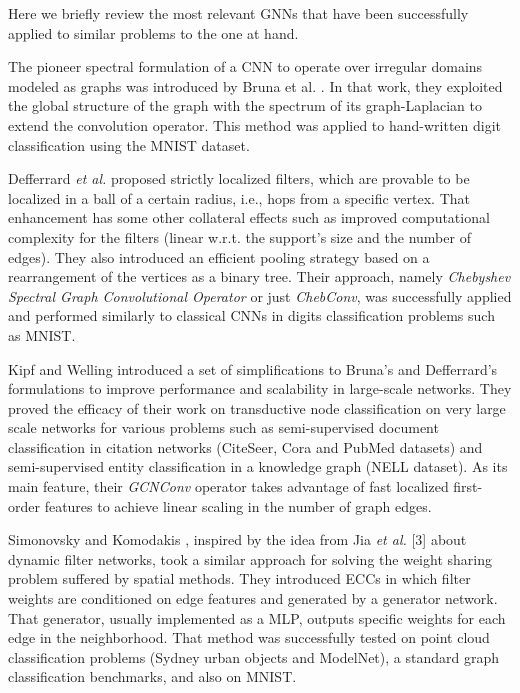 Here we briefly review the most relevant \acp{GNN} that have been successfully applied to similar problems to the one at hand.

The pioneer spectral formulation of a CNN to operate over irregular domains modeled as graphs was introduced by Bruna et al. \cite{Bruna2013}. In that work, they exploited the global structure of the graph with the spectrum of its graph-Laplacian to extend the convolution operator. This method was applied to hand-written digit classification using the \ac{MNIST} dataset.

Defferrard \emph{et al.} \cite{Defferrard2016} proposed strictly localized filters, which are provable to be localized in a ball of a certain radius, i.e., hops from a specific vertex. That enhancement has some other collateral effects such as improved computational complexity for the filters (linear w.r.t. the support’s size and the number of edges). They also introduced an efficient  pooling strategy based on a rearrangement of the vertices as a binary tree. Their approach, namely \emph{Chebyshev Spectral Graph Convolutional Operator} or just \emph{ChebConv}, was successfully applied and performed similarly to classical \acp{CNN} in digits classification problems such as \acs{MNIST}.

Kipf and Welling \cite{Kipf2016} introduced a set of simplifications to Bruna's \cite{Bruna2013} and Defferrard's \cite{Defferrard2016} formulations to improve performance and scalability in large-scale networks. They proved the efficacy of their work on transductive node classification on very large scale networks for various problems such as semi-supervised document classification in citation networks (CiteSeer, Cora and PubMed datasets) and semi-supervised entity classification in a knowledge graph (\acs{NELL} dataset). As its main feature, their \emph{GCNConv} operator takes advantage of fast localized first-order features to achieve linear scaling in the number of graph edges.

Simonovsky and Komodakis \cite{Simonovsky2017}, inspired by the idea from Jia \emph{et al.} [3] about dynamic filter networks, took a similar approach for solving the weight sharing problem suffered by spatial methods. They introduced \acp{ECC} in which filter weights are conditioned on edge features and generated by a generator network. That generator, usually implemented as a \ac{MLP}, outputs specific weights for each edge in the neighborhood. That method was successfully tested on point cloud classification problems (Sydney urban objects and ModelNet), a standard graph classification benchmarks, and also on \acs{MNIST}.

